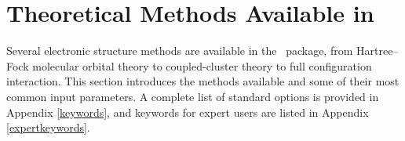 \section{Theoretical Methods Available in \PSIfour}

Several electronic structure methods are available in the \PSIfour\
package, from Hartree--Fock molecular orbital theory to coupled-cluster
theory to full configuration interaction.  This section introduces
the methods available and some of their most common input parameters.
A complete list of standard options is provided in Appendix
\ref{keywords}, and keywords for expert users are listed in Appendix
\ref{expertkeywords}.
 
